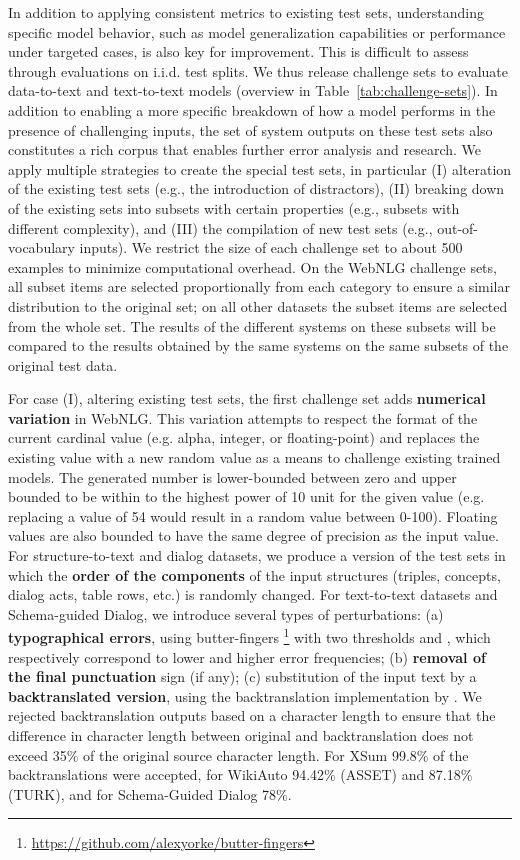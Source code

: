 \documentclass[11pt,a4paper]{article}
\begin{document}
In addition to applying consistent metrics to existing test sets, understanding specific model behavior, such as model generalization capabilities or performance under targeted cases, is also key for improvement. This is difficult to assess through evaluations on i.i.d. test splits. We thus release challenge sets to evaluate data-to-text and text-to-text models (overview in Table~\ref{tab:challenge-sets}). In addition to enabling a more specific breakdown of how a model performs in the presence of challenging inputs, the set of system outputs on these test sets also constitutes a rich corpus that enables further error analysis and research.
We apply multiple strategies to create the special test sets, in particular (I) alteration of the existing test sets (e.g., the introduction of distractors), (II) breaking down of the existing sets into subsets with certain properties (e.g., subsets with different complexity), and (III) the compilation of new test sets (e.g., out-of-vocabulary inputs).
We restrict the size of each challenge set to about 500 examples to minimize computational overhead. On the WebNLG challenge sets, all subset items are selected proportionally from each category to ensure a similar distribution to the original set; on all other datasets the subset items are selected from the whole set. The results of the different systems on these subsets will be compared to the results obtained by the same systems on the same subsets of the original test data. 

For case (I), altering existing test sets, the first challenge set adds \textbf{numerical variation} in WebNLG. This variation attempts to respect the format of the current cardinal value (e.g. alpha, integer, or floating-point) and replaces the existing value with a new random value as a means to challenge existing trained models. The generated number is lower-bounded between zero and upper bounded to be within to the highest power of 10 unit for the given value (e.g. replacing a value of 54 would result in a random value between 0-100). Floating values are also bounded to have the same degree of precision as the input value.  
For structure-to-text and dialog datasets, we produce a version of the test sets in which the \textbf{order of the components} of the input structures (triples, concepts, dialog acts, table rows, etc.) is randomly changed.
For text-to-text datasets and Schema-guided Dialog, we introduce several types of perturbations: (a) \textbf{typographical errors}, using butter-fingers \footnote{\url{https://github.com/alexyorke/butter-fingers}} with two thresholds  and , which respectively correspond to lower and higher error frequencies; (b) \textbf{removal of the final punctuation} sign (if any); (c) substitution of the input text by a \textbf{backtranslated version}, using the backtranslation implementation by \citet{xie2020unsupervised}. We rejected backtranslation outputs based on a character length to ensure that the difference in character length between original and backtranslation does not exceed 35\% of the original source character length. For XSum 99.8\% of the backtranslations were accepted, for WikiAuto 94.42\% (ASSET) and 87.18\% (TURK), and for Schema-Guided Dialog 78\%.
\end{document}
